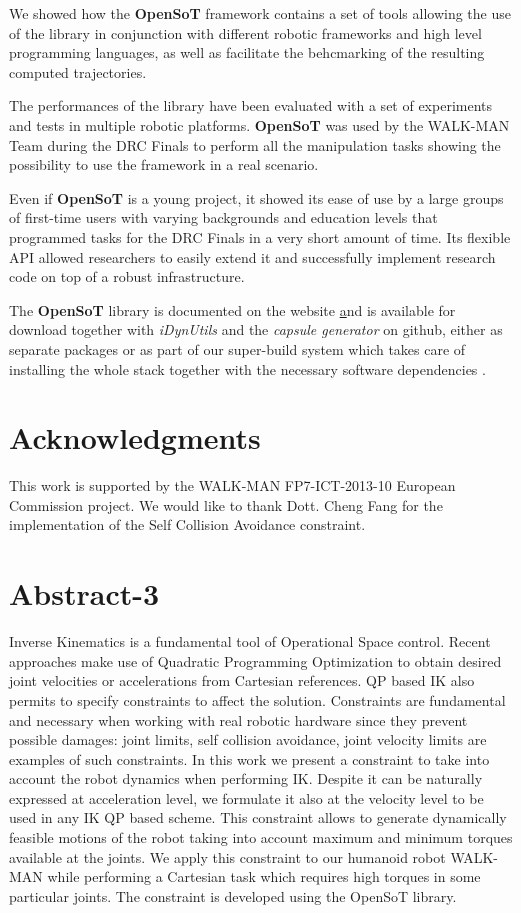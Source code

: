 We showed how the \textbf{OpenSoT} framework contains a set of tools allowing the use of the library in conjunction with different robotic frameworks and high level programming languages, as well as facilitate the behcmarking of the resulting computed trajectories.

The performances of the library have been evaluated with a set of experiments and tests in multiple robotic platforms. \textbf{OpenSoT} was used by the WALK-MAN Team during the DRC Finals to perform all the manipulation tasks showing the possibility to use the framework in a real scenario.

Even if \textbf{OpenSoT} is a young project, it showed its ease of use by a large groups of first-time users with varying backgrounds and education levels that programmed tasks for the DRC Finals in a very short amount of time. Its flexible API allowed researchers\cite{Fang2015-cr} to easily extend it and successfully implement research code on top of a robust infrastructure.

The \textbf{OpenSoT} library is documented on the website \href{http://opensot.github.io} and is available for download together with \emph{iDynUtils} and the \emph{capsule generator} on github, either as separate packages \cite{Mingo2015-oo,Ferrati2015-so,Rocchi_undated-my} or as part of our super-build system which takes care of installing the whole stack together with the necessary software dependencies \cite{Mingo_undated-pj}.

\section*{Acknowledgments}
This work is supported by the WALK-MAN FP7-ICT-2013-10 European Commission project. We would like to thank Dott. Cheng Fang for the implementation of the Self Collision Avoidance constraint. 


\section{Abstract-3}
  Inverse Kinematics is a fundamental tool of Operational Space control. Recent approaches make use of Quadratic Programming Optimization to obtain desired joint velocities or accelerations from Cartesian references. QP based IK also permits to specify constraints to affect the solution. Constraints are fundamental and necessary when working with real robotic hardware since they prevent possible damages: joint limits, self collision avoidance, joint velocity limits are examples of such constraints. In this work we present a constraint to take into account the robot dynamics when performing IK. Despite it can be naturally expressed at acceleration level, we formulate it also at the velocity level to be used in any IK QP based scheme. This constraint allows to generate dynamically feasible motions of the robot taking into account maximum and minimum torques available at the joints. We apply this constraint to our humanoid robot WALK-MAN while performing a Cartesian task which requires high torques in some particular joints. The constraint is developed using the OpenSoT library.


